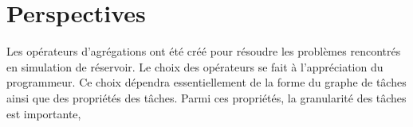 \section{Perspectives}
Les opérateurs d'agrégations ont été créé pour résoudre les problèmes rencontrés en simulation de réservoir.
%
Le choix des opérateurs se fait à l'appréciation du programmeur.
%
Ce choix dépendra essentiellement de la forme du graphe de tâches ainsi que des propriétés des tâches.
%
Parmi ces propriétés, la granularité des tâches est importante,
